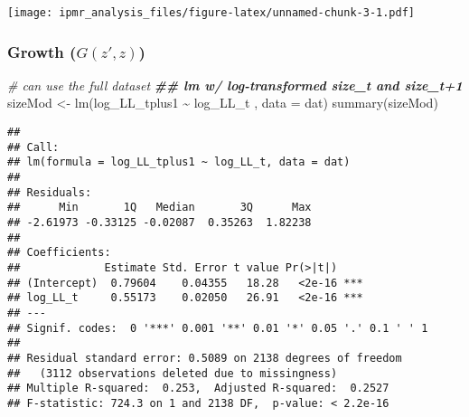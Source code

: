 \documentclass[
]{article}
\newenvironment{Shaded}{\begin{snugshade}}{\end{snugshade}}
\newcommand{\AttributeTok}[1]{\textcolor[rgb]{0.77,0.63,0.00}{#1}}
\newcommand{\CommentTok}[1]{\textcolor[rgb]{0.56,0.35,0.01}{\textit{#1}}}
\newcommand{\ConstantTok}[1]{\textcolor[rgb]{0.00,0.00,0.00}{#1}}
\newcommand{\DecValTok}[1]{\textcolor[rgb]{0.00,0.00,0.81}{#1}}
\newcommand{\DocumentationTok}[1]{\textcolor[rgb]{0.56,0.35,0.01}{\textbf{\textit{#1}}}}
\newcommand{\FunctionTok}[1]{\textcolor[rgb]{0.00,0.00,0.00}{#1}}
\newcommand{\NormalTok}[1]{#1}
\newcommand{\OtherTok}[1]{\textcolor[rgb]{0.56,0.35,0.01}{#1}}
\newcommand{\SpecialCharTok}[1]{\textcolor[rgb]{0.00,0.00,0.00}{#1}}
\newcommand{\StringTok}[1]{\textcolor[rgb]{0.31,0.60,0.02}{#1}}
\begin{document}
\begin{Shaded}
\end{Shaded}

\texttt{[image: ipmr\_analysis\_files/figure-latex/unnamed-chunk-3-1.pdf]}

\hypertarget{growth-gzz}{%
\subsubsection{\texorpdfstring{Growth
(\(G(z',z)\))}{Growth (G(z',z))}}\label{growth-gzz}}

\begin{Shaded}
\begin{Highlighting}[]
\CommentTok{\# can use the full dataset}
\DocumentationTok{\#\# lm w/ log{-}transformed size\_t and size\_t+1}
\NormalTok{sizeMod }\OtherTok{\textless{}{-}} \FunctionTok{lm}\NormalTok{(log\_LL\_tplus1 }\SpecialCharTok{\textasciitilde{}}\NormalTok{ log\_LL\_t , }\AttributeTok{data =}\NormalTok{ dat)}
\FunctionTok{summary}\NormalTok{(sizeMod)}
\end{Highlighting}
\end{Shaded}

\begin{verbatim}
## 
## Call:
## lm(formula = log_LL_tplus1 ~ log_LL_t, data = dat)
## 
## Residuals:
##      Min       1Q   Median       3Q      Max 
## -2.61973 -0.33125 -0.02087  0.35263  1.82238 
## 
## Coefficients:
##             Estimate Std. Error t value Pr(>|t|)    
## (Intercept)  0.79604    0.04355   18.28   <2e-16 ***
## log_LL_t     0.55173    0.02050   26.91   <2e-16 ***
## ---
## Signif. codes:  0 '***' 0.001 '**' 0.01 '*' 0.05 '.' 0.1 ' ' 1
## 
## Residual standard error: 0.5089 on 2138 degrees of freedom
##   (3112 observations deleted due to missingness)
## Multiple R-squared:  0.253,  Adjusted R-squared:  0.2527 
## F-statistic: 724.3 on 1 and 2138 DF,  p-value: < 2.2e-16
\end{verbatim}
\end{document}
